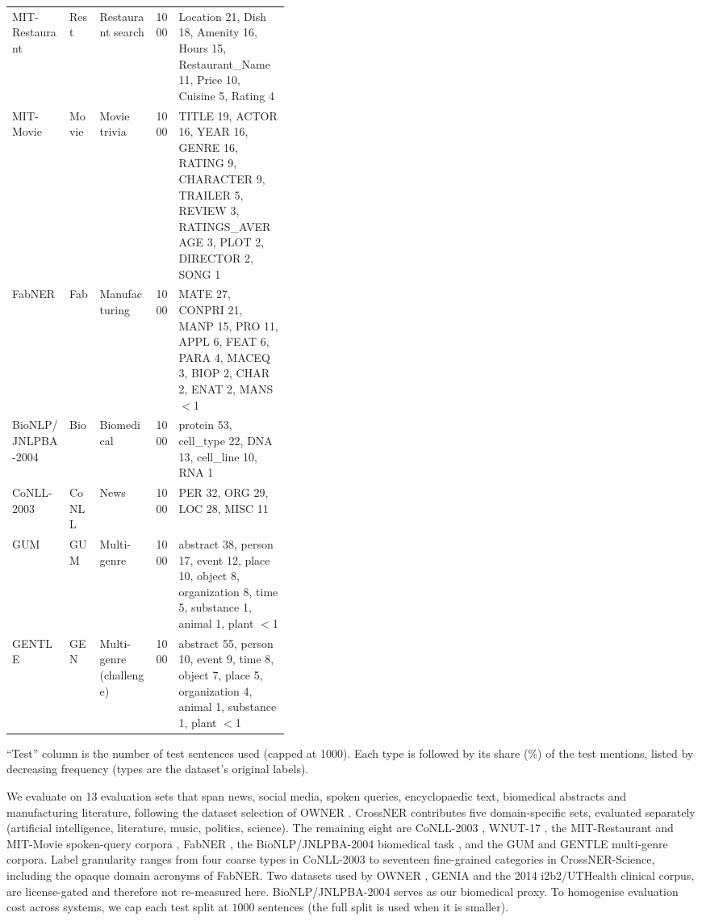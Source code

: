 \begin{table}[H]
\begin{threeparttable}
\begin{tabular}{@{}lllr>{\raggedright\arraybackslash}p{0.40\linewidth}@{}}
\addlinespace
MIT-Restaurant & Rest & Restaurant search & 1000 & Location 21, Dish 18, Amenity 16, Hours 15, Restaurant\_Name 11, Price 10, Cuisine 5, Rating 4 \\
\addlinespace
MIT-Movie & Movie & Movie trivia & 1000 & TITLE 19, ACTOR 16, YEAR 16, GENRE 16, RATING 9, CHARACTER 9, TRAILER 5, REVIEW 3, RATINGS\_AVERAGE 3, PLOT 2, DIRECTOR 2, SONG 1 \\
\addlinespace
FabNER & Fab & Manufacturing & 1000 & MATE 27, CONPRI 21, MANP 15, PRO 11, APPL 6, FEAT 6, PARA 4, MACEQ 3, BIOP 2, CHAR 2, ENAT 2, MANS $<$1 \\
\addlinespace
BioNLP/JNLPBA-2004 & Bio & Biomedical & 1000 & protein 53, cell\_type 22, DNA 13, cell\_line 10, RNA 1 \\
\addlinespace
CoNLL-2003 & CoNLL & News & 1000 & PER 32, ORG 29, LOC 28, MISC 11 \\
\addlinespace
GUM & GUM & Multi-genre & 1000 & abstract 38, person 17, event 12, place 10, object 8, organization 8, time 5, substance 1, animal 1, plant $<$1 \\
\addlinespace
GENTLE & GEN & Multi-genre (challenge) & 1000 & abstract 55, person 10, event 9, time 8, object 7, place 5, organization 4, animal 1, substance 1, plant $<$1 \\
\bottomrule
\end{tabular}
\begin{tablenotes}[flushleft]
\footnotesize
\item ``Test'' column is the number of test sentences used (capped at 1000). Each type is followed by its share (\%) of the test mentions, listed by decreasing frequency (types are the dataset's original labels).
\end{tablenotes}
\end{threeparttable}
\end{table}

We evaluate on 13 evaluation sets that span news, social media, spoken queries, encyclopaedic text, biomedical abstracts and manufacturing literature, following the dataset selection of OWNER \cite{genest2025owner}.
CrossNER \cite{liu2021crossner} contributes five domain-specific sets, evaluated separately (artificial intelligence, literature, music, politics, science).
The remaining eight are CoNLL-2003 \cite{tjongkimsang2003conll}, WNUT-17 \cite{derczynski2017wnut}, the MIT-Restaurant and MIT-Movie spoken-query corpora \cite{liu2013asgard}, FabNER \cite{kumar2022fabner}, the BioNLP/JNLPBA-2004 biomedical task \cite{kim2004jnlpba}, and the GUM \cite{zeldes2017gum} and GENTLE \cite{aoyama2023gentle} multi-genre corpora.
Label granularity ranges from four coarse types in CoNLL-2003 to seventeen fine-grained categories in CrossNER-Science, including the opaque domain acronyms of FabNER.
Two datasets used by OWNER \cite{genest2025owner}, GENIA \cite{kim2003genia} and the 2014 i2b2/UTHealth clinical corpus, are license-gated and therefore not re-measured here. BioNLP/JNLPBA-2004 serves as our biomedical proxy.
To homogenise evaluation cost across systems, we cap each test split at $1000$ sentences (the full split is used when it is smaller).

